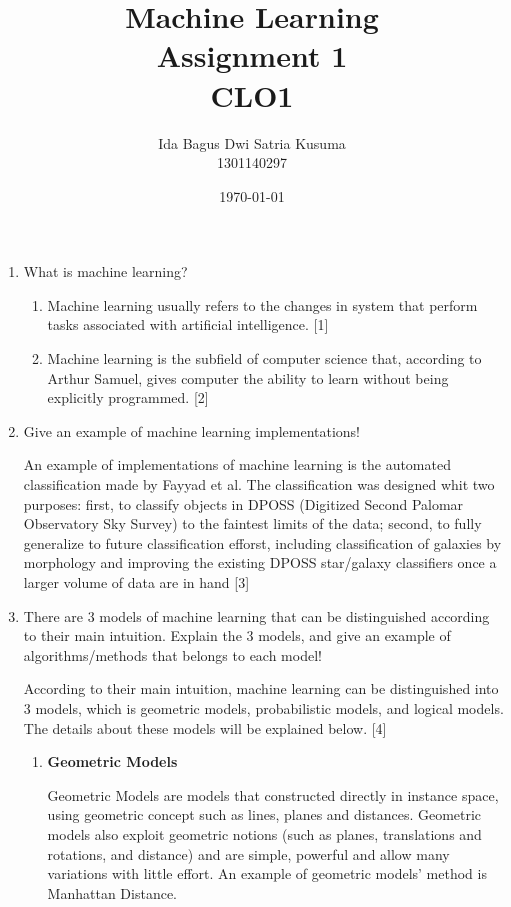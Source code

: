 \documentclass[12pt]{article}%
\begin{document}
\title{Machine Learning \protect\\ Assignment 1 \protect\\ CLO1} 
\author{Ida Bagus Dwi Satria Kusuma \protect\\ 1301140297}
\date{\today}
\maketitle

\begin{enumerate}
	\item What is machine learning? 
	\begin{enumerate}
		\item Machine learning usually refers to the changes in system that perform tasks associated with artificial intelligence. [1]
		\item Machine learning is the subfield of computer science that, according to Arthur Samuel, gives computer the ability to learn without being explicitly programmed. [2]
	\end{enumerate}

	\item Give an example of machine learning implementations!
	\par An example of implementations of machine learning is the automated classification made by Fayyad et al. The classification was designed whit two purposes: first, to classify objects in DPOSS (Digitized Second Palomar Observatory Sky Survey) to the faintest limits of the data; second, to fully generalize to future classification efforst, including classification of galaxies by morphology and improving the existing DPOSS star/galaxy classifiers once a larger volume of data are in hand [3]

	\item There are 3 models of machine learning that can be distinguished according to their main intuition. Explain the 3 models, and give an example of algorithms/methods that belongs to each model!

	\par According to their main intuition, machine learning can be distinguished into 3 models, which is geometric models, probabilistic models, and logical models. The details about these models will be explained below. [4]

	\begin{enumerate}
		\item \textbf{Geometric Models}
		\par Geometric Models are models that constructed directly in instance space, using geometric concept such as lines, planes and distances. Geometric models also exploit geometric notions (such as planes, translations and rotations, and distance) and are simple, powerful and allow many variations with little effort. An example of geometric models' method  is Manhattan Distance.


\end{enumerate}
\end{enumerate}
\end{document}
